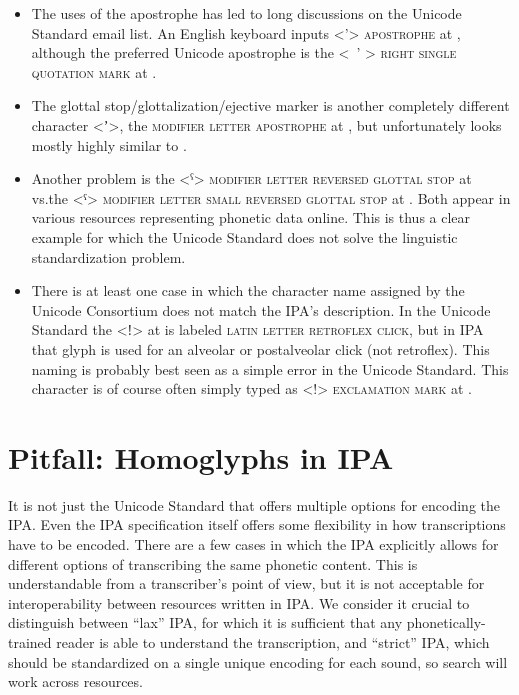 \begin{itemize}
	\item The uses of the apostrophe has led to long discussions on the Unicode
       Standard email list. An English keyboard inputs <{'}> \textsc{apostrophe}
       at , although the preferred Unicode apostrophe is the <\ ' >
       \textsc{right single quotation mark} at .
     \item The glottal stop/glottalization/ejective marker is another completely
        different character <{\large ʼ}>, the \textsc{modifier letter apostrophe} at
        , but unfortunately looks mostly highly similar to
        . 
	\item Another problem is the <ˁ> \textsc{modifier letter reversed
       glottal stop} at  vs.\@ the <ˤ> \textsc{modifier
       letter small reversed glottal stop} at . Both 
       appear in various resources representing phonetic data online. This is
       thus a clear example for which the Unicode Standard does not solve the
       linguistic standardization problem. 
	\item There is at least one case in which the character name assigned by the
       Unicode Consortium does not match the IPA's description. In the Unicode
       Standard the <ǃ> at  is labeled \textsc{latin letter retroflex
       click}, but in IPA that glyph is used for an alveolar or postalveolar
       click (not retroflex). This naming is probably best seen as a simple
       error in the Unicode Standard. This character is of course often simply
       typed as <!> \textsc{exclamation mark} at . \end{itemize}       

\section{Pitfall: Homoglyphs in IPA}
\label{pitfall-homoglyphs-in-IPA}

It is not just the Unicode Standard that offers multiple options for encoding
the IPA. Even the IPA specification itself offers some flexibility in how
transcriptions have to be encoded. There are a few cases in which the IPA
explicitly allows for different options of transcribing the same phonetic
content. This is understandable from a transcriber's point of view, but it is
not acceptable for interoperability between resources written in IPA. We
consider it crucial to distinguish between ``lax'' IPA, for which it is
sufficient that any phonetically-trained reader is able to understand the
transcription, and ``strict'' IPA, which should be standardized on a single
unique encoding for each sound, so search will work across resources.

